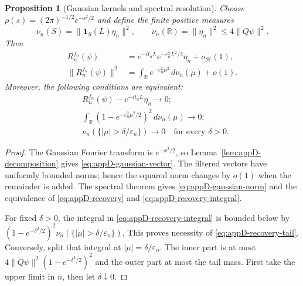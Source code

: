 \documentclass[a4paper,11pt]{article}
\newtheorem{proposition}[theorem]{Proposition}
\theoremstyle{definition}
\begin{document}
\begin{proposition}[Gaussian kernels and spectral resolution]
\label{prop:appD-gaussian}
Choose $\rho(s)=(2\pi)^{-1/2}e^{-s^2/2}$ and define the finite positive measures
\begin{equation}
 \nu_n(S)=\|\mathbf1_S(L)\eta_n\|^2,
 \qquad \nu_n(\mathbb R)=\|\eta_n\|^2\le4\|Q\psi\|^2 .
 \label{eq:appD-measures}
\end{equation}
Then
\begin{align}
 R_n^{f_n}(\psi)
 &=e^{-it_nL}e^{-\varepsilon_n^2L^2/2}\eta_n
       +o_{\mathcal H}(1),\label{eq:appD-gaussian-vector}\\
 \|R_n^{f_n}(\psi)\|^2
 &=\int_{\mathbb R}e^{-\varepsilon_n^2\mu^2}\,d\nu_n(\mu)+o(1).
 \label{eq:appD-gaussian-norm}
\end{align}
Moreover, the following conditions are equivalent:
\begin{align}
 &R_n^{f_n}(\psi)-e^{-it_nL}\eta_n\longrightarrow0;
 \label{eq:appD-recovery}\\
 &\int_{\mathbb R}
 (1-e^{-\varepsilon_n^2\mu^2/2})^2\,d\nu_n(\mu)\longrightarrow0;
 \label{eq:appD-recovery-integral}\\
 &\nu_n(\{|\mu|>\delta/\varepsilon_n\})\longrightarrow0
 \quad\text{for every }\delta>0.
 \label{eq:appD-recovery-tail}
\end{align}
\end{proposition}
\begin{proof}
The Gaussian Fourier transform is $e^{-x^2/2}$, so Lemma~\ref{lem:appD-decomposition} gives \eqref{eq:appD-gaussian-vector}. The filtered vectors have uniformly bounded norms; hence the squared norm changes by $o(1)$ when the remainder is added. The spectral theorem gives \eqref{eq:appD-gaussian-norm} and the equivalence of \eqref{eq:appD-recovery} and \eqref{eq:appD-recovery-integral}.

For fixed $\delta>0$, the integral in \eqref{eq:appD-recovery-integral} is bounded below by
$(1-e^{-\delta^2/2})^2\nu_n(\{|\mu|>\delta/\varepsilon_n\})$.
This proves necessity of \eqref{eq:appD-recovery-tail}. Conversely, split that integral at $|\mu|=\delta/\varepsilon_n$. The inner part is at most
$4\|Q\psi\|^2(1-e^{-\delta^2/2})^2$ and the outer part at most the tail mass. First take the upper limit in $n$, then let $\delta\downarrow0$.
\end{proof}
\end{document}
